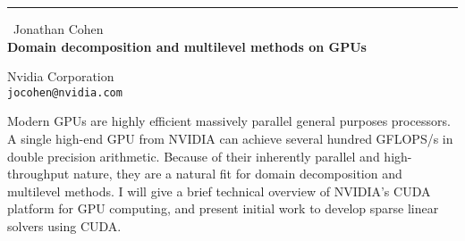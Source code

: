 \documentclass{report}
\begin{document}
\begin{center}
\rule{6in}{1pt} \
{\large Jonathan Cohen \\
{\bf Domain decomposition and multilevel methods on GPUs}}

Nvidia Corporation %
\\
{\tt jocohen@nvidia.com}\end{center}

Modern GPUs are highly efficient massively parallel general purposes
processors. A single high-end GPU from NVIDIA can achieve several hundred
GFLOPS/s in double precision arithmetic. Because of their inherently
parallel and high-throughput nature, they are a natural fit for domain
decomposition and multilevel methods. I will give a brief technical
overview of NVIDIA's CUDA platform for GPU computing, and present initial
work to develop sparse linear solvers using CUDA.
\end{document}
